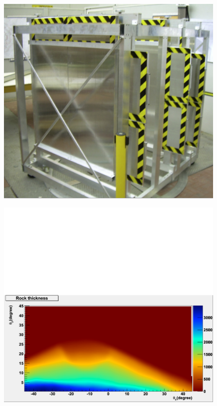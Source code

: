 \begin{figure}[!h]
\centering
\begin{minipage}{.45\textwidth}
  \centering
  \includegraphics[width=\linewidth]{Chapter6/Figs/Raster/muRayDetectorsAdj.png}
  \label{fig:muRayDetectors}
  \vspace{0.478cm} %
\end{minipage}%
\qquad
\begin{minipage}{.45\textwidth}
  \centering
  \includegraphics[width=\linewidth]{Chapter6/Figs/Raster/mtVesuviusMuRayImagingAdj.png}

\end{minipage}
\end{figure}
